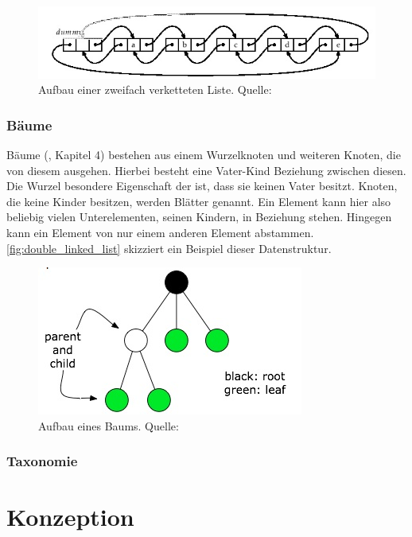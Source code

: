 \documentclass[a4paper]{article}
\begin{document}
	\begin{figure}[H] 
		\includegraphics[width=\linewidth]{../Bilder/double_linked_list.jpg}
		\caption
		{
			Aufbau einer zweifach verketteten Liste.
			Quelle: \cite{DLList}
		}
		\label{fig:double_linked_list}
	\end{figure}	
	
	\subsubsection{Bäume}
	
	Bäume (\cite{FundData}, Kapitel 4) bestehen aus einem Wurzelknoten
	und weiteren Knoten, die von diesem ausgehen. Hierbei besteht eine Vater-Kind
	Beziehung zwischen diesen. Die Wurzel besondere Eigenschaft der ist, dass
	sie keinen Vater besitzt. Knoten, die keine Kinder besitzen, werden Blätter
	genannt. Ein Element kann hier also beliebig vielen Unterelementen, seinen
	Kindern, in Beziehung stehen. Hingegen kann ein Element von nur einem anderen
	Element abstammen. \autoref{fig:double_linked_list} skizziert ein Beispiel
	dieser Datenstruktur.
	
	\begin{figure}[H] 
		\centerline{
			\includegraphics{../Bilder/tree.jpg}
		}
		\caption
		{
			Aufbau eines Baums.
			Quelle: \cite{Trees}
		}
		\label{fig:double_linked_list}
	\end{figure}	
	
	\subsubsection{Ta­xo­no­mie}
	
	\newpage
	
	\section{Konzeption}	
	
\end{document}
